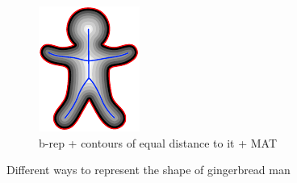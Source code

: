 \begin{figure}
\begin{subfigure}[b]{0.3\linewidth}
		\includegraphics[width=\textwidth]{figs/gingerbreadman_grassfire.pdf}
		\caption{b-rep + contours of equal distance to it + MAT}
		\label{fig:gbm:dt}
	\end{subfigure}
	
	\caption{Different ways to represent the shape of gingerbread man}
	\label{fig:gingerman}
\end{figure}
